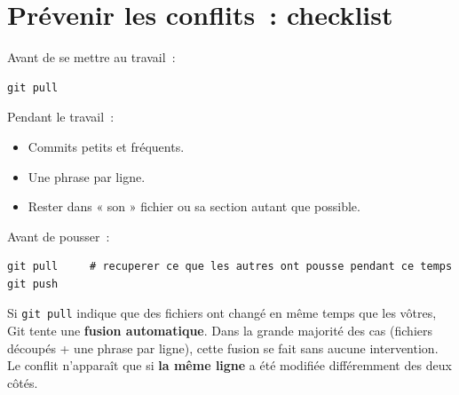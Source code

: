 \documentclass[11pt,a4paper]{article}
\begin{document}
\section{Prévenir les conflits~: checklist}

Avant de se mettre au travail~:

\begin{lstlisting}[style=bashstyle]
git pull
\end{lstlisting}

Pendant le travail~:
\begin{itemize}
  \item Commits petits et fréquents.
  \item Une phrase par ligne.
  \item Rester dans « son » fichier ou sa section autant que possible.
\end{itemize}

Avant de pousser~:

\begin{lstlisting}[style=bashstyle]
git pull     # recuperer ce que les autres ont pousse pendant ce temps
git push
\end{lstlisting}

Si \texttt{git pull} indique que des fichiers ont changé en même temps que les vôtres, Git tente une \textbf{fusion automatique}. Dans la grande majorité des cas (fichiers découpés + une phrase par ligne), cette fusion se fait sans aucune intervention. Le conflit n'apparaît que si \textbf{la même ligne} a été modifiée différemment des deux côtés.

%
%
%
%
\end{document}
